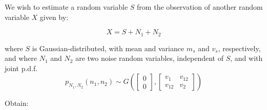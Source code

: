 \else

\question 
 We wish to estimate a random variable $S$ from the observation of another random variable $X$ given by:

$$X=S+N_1+N_2$$

where $S$ is Gaussian-distributed, with mean and variance $m_s$ and $v_s$, respectively, and where $N_1$ and $N_2$ are two noise random variables, independent of $S$, and with joint p.d.f. 
 $$p_{N_1,N_2}\left ( n_1,n_2\right) \sim G\left (  \left[ \begin{array}{c}   0 \\ 0    \end{array} \right] , \left[ \begin{array}{cc}  v_1 & v_{12} \\ v_{12} & v_2  \end{array} \right]\right)$$

Obtain:

\begin{solution}
 \end{solution}

\fi
